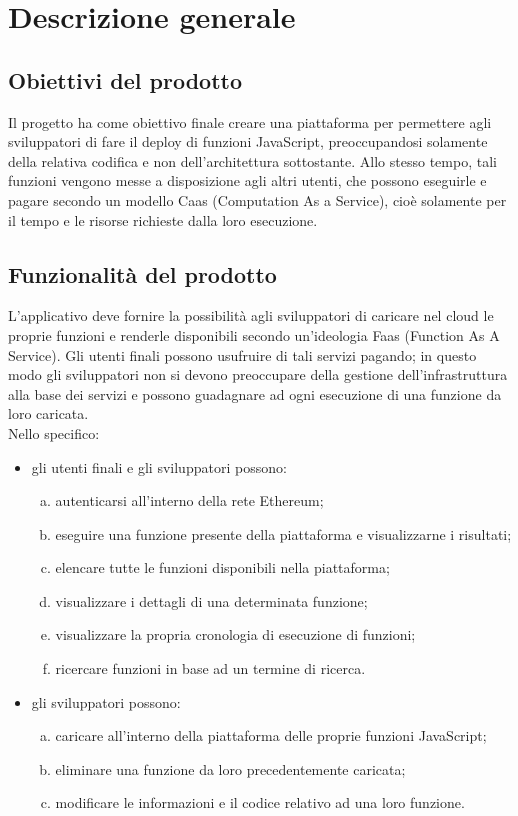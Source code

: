\section{Descrizione generale}

\subsection{Obiettivi del prodotto}
Il progetto \NomeProgetto{} ha come obiettivo finale creare una piattaforma per permettere agli sviluppatori di fare il deploy di funzioni JavaScript, preoccupandosi solamente della relativa codifica e non dell'architettura sottostante. Allo stesso tempo, tali funzioni vengono messe a disposizione agli altri utenti, che possono eseguirle e pagare secondo un modello Caas (Computation As a Service), cioè solamente per il tempo e le risorse richieste dalla loro esecuzione.

\subsection{Funzionalità del prodotto}
L'applicativo deve fornire la possibilità agli sviluppatori di caricare nel cloud le proprie funzioni e renderle disponibili secondo un'ideologia Faas (Function As A Service). Gli utenti finali possono usufruire di tali servizi pagando; in questo modo gli sviluppatori non si devono preoccupare della gestione dell'infrastruttura alla base dei servizi e possono guadagnare ad ogni esecuzione di una funzione da loro caricata. \\
Nello specifico: 
	\begin{itemize}
		\item gli utenti finali e gli sviluppatori possono: 
		\begin{enumerate}[a.]
			\item autenticarsi all'interno della rete Ethereum; 
			\item eseguire una funzione presente della piattaforma e visualizzarne i risultati; 
			\item elencare tutte le funzioni disponibili nella piattaforma; 
			\item visualizzare i dettagli di una determinata funzione; 
			\item visualizzare la propria cronologia di esecuzione di funzioni; 
			\item ricercare funzioni in base ad un termine di ricerca. 
		\end{enumerate}
		
		\item gli sviluppatori possono: 
		\begin{enumerate}[a.]
			\item caricare all'interno della piattaforma delle proprie funzioni JavaScript; 
			\item eliminare una funzione da loro precedentemente caricata; 
			\item modificare le informazioni e il codice relativo ad una loro funzione.
		\end{enumerate}
	\end{itemize}

